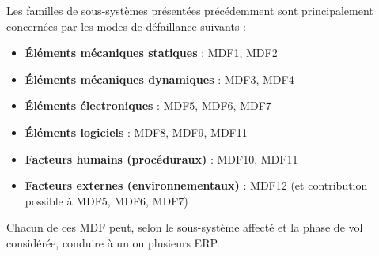 
Les familles de sous-systèmes présentées précédemment sont principalement concernées par les modes de défaillance suivants :\\
\begin{itemize}
    \item \textbf{Éléments mécaniques statiques} : \acrshort{MDF}1, \acrshort{MDF}2
    \item \textbf{Éléments mécaniques dynamiques} : \acrshort{MDF}3, \acrshort{MDF}4
    \item \textbf{Éléments électroniques} : \acrshort{MDF}5, \acrshort{MDF}6, \acrshort{MDF}7
    \item \textbf{Éléments logiciels} : \acrshort{MDF}8, \acrshort{MDF}9, \acrshort{MDF}11
    \item \textbf{Facteurs humains (procéduraux)} : \acrshort{MDF}10, \acrshort{MDF}11
    \item \textbf{Facteurs externes (environnementaux)} : \acrshort{MDF}12 (et contribution possible à \acrshort{MDF}5,
    \acrshort{MDF}6, \acrshort{MDF}7)\\
\end{itemize}

Chacun de ces \acrlong{MDF} peut, selon le sous-système affecté et la phase de vol considérée, conduire à un ou plusieurs
\acrshort{ERP}.

\newpage
